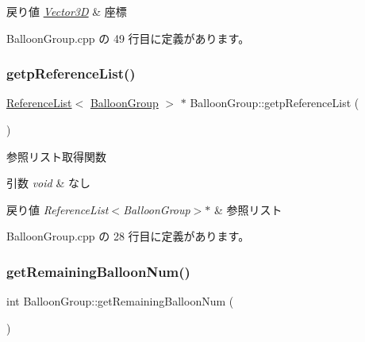 \begin{DoxyRetVals}{戻り値}
{\em \mbox{\hyperlink{class_vector3_d}{Vector3D}}} & 座標 \\
\hline
\end{DoxyRetVals}


 Balloon\+Group.\+cpp の 49 行目に定義があります。

\mbox{\label{class_balloon_group_aa32071776f49db498c51e71d39ba0f19}} 
\subsubsection{\texorpdfstring{getp\+Reference\+List()}{getpReferenceList()}}
{\footnotesize\ttfamily \mbox{\hyperlink{class_reference_list}{Reference\+List}}$<$ \mbox{\hyperlink{class_balloon_group}{Balloon\+Group}} $>$ $\ast$ Balloon\+Group\+::getp\+Reference\+List (\begin{DoxyParamCaption}{ }\end{DoxyParamCaption})}



参照リスト取得関数 


\begin{DoxyParams}{引数}
{\em void} & なし \\
\hline
\end{DoxyParams}

\begin{DoxyRetVals}{戻り値}
{\em Reference\+List$<$\+Balloon\+Group$>$$\ast$} & 参照リスト \\
\hline
\end{DoxyRetVals}


 Balloon\+Group.\+cpp の 28 行目に定義があります。

\mbox{\label{class_balloon_group_ae70b007902b2f9f2d4452f26c98dcca9}} 
\subsubsection{\texorpdfstring{get\+Remaining\+Balloon\+Num()}{getRemainingBalloonNum()}}
{\footnotesize\ttfamily int Balloon\+Group\+::get\+Remaining\+Balloon\+Num (\begin{DoxyParamCaption}{ }\end{DoxyParamCaption})}



